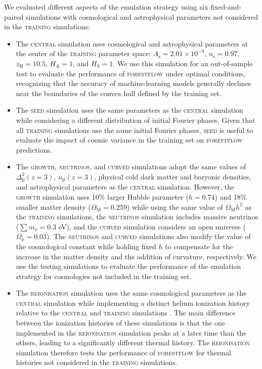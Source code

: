 \documentclass[longauth]{aa}
\newcommand{\forestflow}{\textsc{forestflow}\xspace}
\newcommand{\lacehc}{\textsc{training}\xspace}
\newcommand{\simseed}{\textsc{seed}\xspace}
\newcommand{\simigm}{\textsc{reionisation}\xspace}
\newcommand{\simcurved}{\textsc{curved}\xspace}
\newcommand{\simh}{\textsc{growth}\xspace}
\newcommand{\simnu}{\textsc{neutrinos}\xspace}
\newcommand{\simcentral}{\textsc{central}\xspace}
\begin{document}
We evaluated different aspects of the emulation strategy using six fixed-and-paired simulations with cosmological and astrophysical parameters not considered in the \lacehc simulations:
%
\begin{itemize}
    \item The \simcentral simulation uses cosmological and astrophysical parameters at the center of the \lacehc parameter space: $A_\mathrm{s}=2.01\times10^{-9}$, $n_\mathrm{s}=0.97$, $z_\mathrm{H}=10.5$, $H_\mathrm{A}=1$, and $H_\mathrm{S}=1$. We use this simulation for an out-of-sample test to evaluate the performance of \forestflow under optimal conditions, recognizing that the accuracy of machine-learning models generally declines near the boundaries of the convex hull defined by the training set.
    
    \item The \simseed simulation uses the same parameters as the \simcentral simulation while considering a different distribution of initial Fourier phases. Given that all \lacehc simulations use the same initial Fourier phases, \simseed is useful to evaluate the impact of cosmic variance in the training set on \forestflow predictions.
    
    \item The \simh, \simnu, and \simcurved simulations adopt the same values of $\Delta^2_\mathrm{p}(z=3)$, $n_\mathrm{p}(z=3)$, physical cold dark matter and baryonic densities, and astrophysical parameters as the \simcentral simulation. However, the \simh simulation uses 10\% larger Hubble parameter ($h=0.74$) and 18\% smaller matter density ($\Omega_\mathrm{M}=0.259$) while using the same value of $\Omega_\mathrm{M} h^2$ as the \lacehc simulations, the \simnu simulation includes massive neutrinos ($\sum m_\nu=0.3$ eV), and the \simcurved simulation considers an open universe ($\Omega_k=0.03$). The \simnu and \simcurved simulations also modify the value of the cosmological constant while holding fixed $h$ to compensate for the increase in the matter density and the addition of curvature, respectively. We use the testing simulations to evaluate the performance of the emulation strategy for cosmologies not included in the training set.

    \item The \simigm simulation uses the same cosmological parameters as the \simcentral simulation while implementing a distinct helium ionization history relative to the \simcentral and \lacehc simulations \citep{puchwein2019ConsistentModellingMetagalactic}. The main difference between the ionization histories of these simulations is that the one implemented in the \simigm simulation peaks at a later time than the others, leading to a significantly different thermal history. The \simigm simulation therefore tests the performance of \forestflow for thermal histories not considered in the \lacehc simulations.
\end{itemize}
\end{document}
